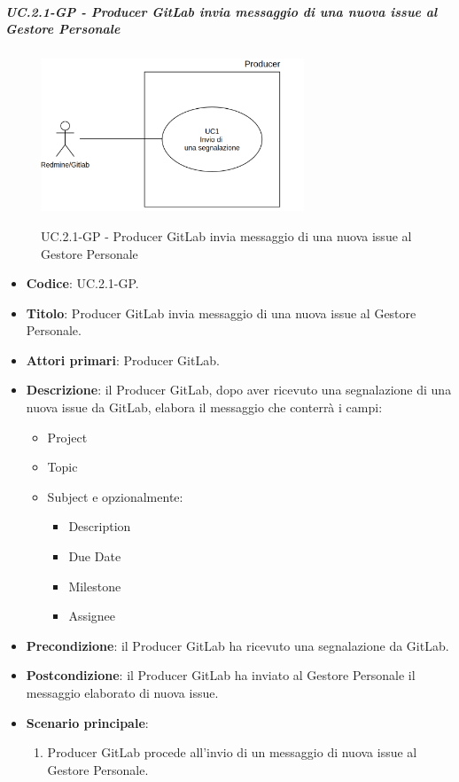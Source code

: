 			\subparagraph{UC\theuccount.2.1-GP - Producer GitLab invia messaggio di una nuova issue al Gestore Personale}
				\begin{figure}[H]
					\centering
					\includegraphics[width=0.7\textwidth]{img/UC1.png}\\
					\caption{UC\theuccount.2.1-GP - Producer GitLab invia messaggio di una nuova issue al Gestore Personale}
				\end{figure}
				\begin{itemize}
					\item \textbf{Codice}: UC\theuccount.2.1-GP.
					\item \textbf{Titolo}: Producer GitLab invia messaggio di una nuova issue al Gestore Personale.
					\item \textbf{Attori primari}: Producer GitLab.
					\item \textbf{Descrizione}: il Producer GitLab, dopo aver ricevuto una segnalazione di una nuova issue
					da GitLab, elabora il messaggio che conterrà i campi:
					\begin{itemize}
						\item Project
						\item Topic
						\item Subject e opzionalmente:
						\begin{itemize}
							\item Description
							\item Due Date
							\item Milestone
							\item Assignee
						\end{itemize}
					\end{itemize}
					\item \textbf{Precondizione}: il Producer GitLab ha ricevuto una segnalazione da GitLab.
					\item \textbf{Postcondizione}: il Producer GitLab ha inviato al Gestore Personale il messaggio elaborato di nuova issue.
					\item \textbf{Scenario principale}: 
					\begin{enumerate}
						\item Producer GitLab procede all'invio di un messaggio di
						nuova issue al Gestore Personale.
					\end{enumerate}
					
				\end{itemize}
		
